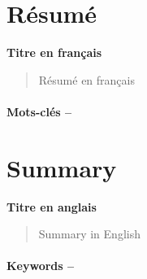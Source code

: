 
\clearforchapter
\section*{Résumé}

\noindent
\textbf{Titre en français}

\begin{quote}
	Résumé en français
\end{quote}

\paragraph{Mots-clés --} 

\clearpage
\section*{Summary}

\noindent
\textbf{Titre en anglais}

\begin{quote}
	Summary in English
\end{quote}

\paragraph{Keywords --} 